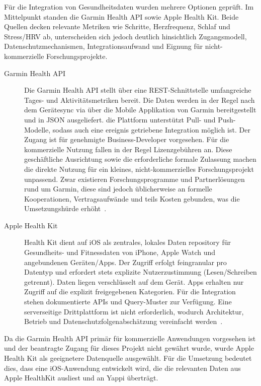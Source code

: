 \documentclass[12pt,a4paper]{report}
\begin{document}
Für die Integration von Gesundheitsdaten wurden mehrere Optionen geprüft. Im Mittelpunkt standen die Garmin Health API sowie Apple
Health Kit. Beide Quellen decken relevante Metriken wie Schritte, Herzfrequenz, Schlaf und Stress/HRV ab, unterscheiden sich jedoch
deutlich hinsichtlich Zugangsmodell, Datenschutzmechanismen, Integrationsaufwand und Eignung für nicht-kommerzielle
Forschungsprojekte.

\begin{description}
  \item[Garmin Health API] Die Garmin Health API stellt über eine REST-Schnittstelle umfangreiche Tages- und Aktivitätsmetriken
    bereit. Die Daten werden in der Regel nach dem Gerätesync via über die Mobile Applikation von Garmin bereitgestellt und in
    JSON ausgeliefert. die Plattform unterstützt Pull- und Push-Modelle, sodass auch eine ereignis getriebene Integration möglich
    ist. Der Zugang ist für genehmigte Business-Developer vorgesehen. Für die kommerzielle Nutzung fallen in der Regel
    Lizenzgebühren an. Diese geschäftliche Ausrichtung sowie die erforderliche formale Zulassung machen die direkte Nutzung für
    ein kleines, nicht-kommerzielles Forschungsprojekt unpassend. Zwar existieren Forschungsprogramme und Partnerlösungen rund um
    Garmin, diese sind jedoch üblicherweise an formelle Kooperationen, Vertragsaufwände und teils Kosten gebunden, was die
    Umsetzungshürde erhöht~\cite{garmin_healthapi_2025}.
  \item[Apple Health Kit] Health Kit dient auf iOS als zentrales, lokales Daten repository für Gesundheits- und Fitnessdaten von
    iPhone, Apple Watch und angebundenen Geräten/Apps. Der Zugriff erfolgt feingranular pro Datentyp und erfordert stets explizite
    Nutzerzustimmung (Lesen/Schreiben getrennt). Daten liegen verschlüsselt auf dem Gerät. Apps erhalten nur Zugriff auf die
    explizit freigegebenen Kategorien. Für die Integration stehen dokumentierte APIs und Query-Muster zur Verfügung. Eine
    serverseitige Drittplattform ist nicht erforderlich, wodurch Architektur, Betrieb und Datenschutzfolgenabschätzung vereinfacht
    werden~\cite{apple_healthkit_2025}.
\end{description}

Da die Garmin Health API primär für kommerzielle Anwendungen vorgesehen ist und der beantragte Zugang für dieses Projekt nicht
gewährt wurde, wurde Apple Health Kit als geeignetere Datenquelle ausgewählt. Für die Umsetzung bedeutet dies, dass eine
iOS-Anwendung entwickelt wird, die die relevanten Daten aus Apple HealthKit ausliest und an Yappi überträgt.
\end{document}
